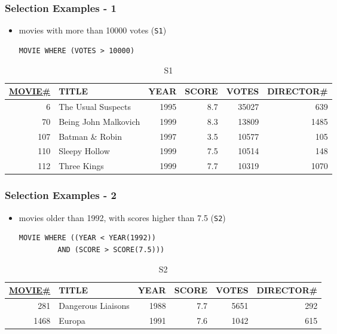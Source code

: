 \documentclass[dvipsnames]{beamer}
\theoremstyle{plain}
\begin{document}
\begin{frame}[fragile]
  \frametitle{Selection Examples - 1}

  \begin{itemize}
    \item movies with more than 10000 votes (\texttt{S1})
    \begin{lstlisting}
MOVIE WHERE (VOTES > 10000)
    \end{lstlisting}
  \end{itemize}

  \vspace{-10pt}
  \begin{tiny}
  \begin{table}
    \caption{S1}
    \begin{tabular}{|r|l|r|r|r|r|}\hline
\underline{MOVIE\#} & TITLE & YEAR & SCORE & VOTES & DIRECTOR\#\\[2pt]\hline\hline
  6 & The Usual Suspects    & 1995 &   8.7 & 35027 &        639\\\hline
 70 & Being John Malkovich  & 1999 &   8.3 & 13809 &       1485\\\hline
107 & Batman \& Robin       & 1997 &   3.5 & 10577 &        105\\\hline
110 & Sleepy Hollow         & 1999 &   7.5 & 10514 &        148\\\hline
112 & Three Kings           & 1999 &   7.7 & 10319 &       1070\\\hline
    \end{tabular}
  \end{table}
  \end{tiny}
\end{frame}

\begin{frame}[fragile]
  \frametitle{Selection Examples - 2}

  \begin{itemize}
    \item movies older than 1992, with scores higher than 7.5
      (\texttt{S2})
    \begin{lstlisting}
MOVIE WHERE ((YEAR < YEAR(1992))
         AND (SCORE > SCORE(7.5)))
    \end{lstlisting}
  \end{itemize}

  \vspace{-10pt}
  \begin{tiny}
  \begin{table}
    \caption{S2}
    \begin{tabular}{|r|l|r|r|r|r|}\hline
\underline{MOVIE\#} & TITLE & YEAR & SCORE & VOTES & DIRECTOR\#\\[2pt]\hline\hline
   281 & Dangerous Liaisons & 1988 &   7.7 &  5651 &        292\\\hline
  1468 & Europa             & 1991 &   7.6 &  1042 &        615\\\hline
    \end{tabular}
  \end{table}
  \end{tiny}
\end{frame}
\end{document}
